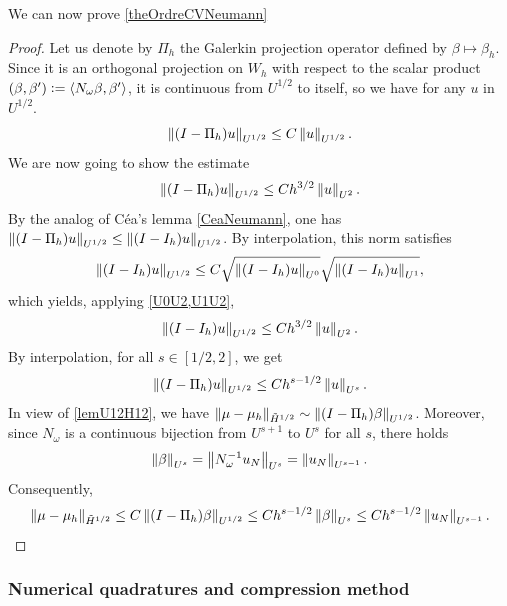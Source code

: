 \documentclass[a4paper]{article}
\begin{document}
\noindent We can now prove \autoref{theOrdreCVNeumann}
\begin{proof}
	Let us denote by $\Pi_h$ the Galerkin projection operator defined by $\beta \mapsto \beta_h$. Since it is an orthogonal projection on $W_h$ with respect to the scalar product $(\beta,\beta') \mathrel{\mathop:}= \left\langle N_\omega \beta,\beta'\right\rangle$, it is continuous from $U^{1/2}$ to itself, so we have for any $u$ in $U^{1/2}$. 
	\[\left\|(I - \Pi_h)u\right\|_{U^{1/2}} \leq C \left\|u\right\|_{U^{1/2}}.\]
	We are now going to show the estimate
	\[\left\|(I - \Pi_h)u\right\|_{U^{1/2}} \leq C h^{3/2} \left\|u\right\|_{U^{2}}.\]
	By the analog of Céa's lemma \autoref{CeaNeumann}, one has $\left\|(I-\Pi_h)u\right\|_{U^{1/2}} \leq \left\|(I - I_h) u\right\|_{U^{1/2}}$. By interpolation, this norm satisfies
	\[\left\|(I - I_h)u\right\|_{U^{1/2}} \leq C \sqrt{\left\|(I - I_h)u\right\|_{U^{0}}}\sqrt{\left\|(I - I_h)u\right\|_{U^{1}}},\]
	which yields, applying \autoref{U0U2,U1U2},
	\[\left\|(I - I_h)u\right\|_{U^{1/2}} \leq C h^{3/2} \left\|u\right\|_{U^2}.\]
	By interpolation, for all $s \in [1/2,2]$, we get
	\[\left\|(I - \Pi_h)u\right\|_{U^{1/2}} \leq C h^{s - 1/2} \left\|u\right\|_{U^s}.\]
	In view of \autoref{lemU12H12}, we have $\left\|\mu - \mu_h\right\|_{\tilde{H}^{1/2}} \sim \left\|(I - \Pi_h)\beta\right\|_{U^{1/2}}$. Moreover, since $N_\omega$ is a continuous bijection from $U^{s+1}$ to $U^s$ for all $s$, there holds
	\[\left\|\beta\right\|_{U^s} = \left\|N_\omega^{-1} u_N\right\|_{U^s} = \left\|u_N\right\|_{U^{s-1}}.\]
	Consequently, 
	\[\left\|\mu - \mu_h\right\|_{\tilde{H}^{1/2}} \leq  C\left\|(I - \Pi_h)\beta\right\|_{U^{1/2}} \leq C h^{s - 1/2} \left\|\beta\right\|_{U^s} \leq C h^{s - 1/2} \left\|u_N\right\|_{U^{s-1}}.\]
\end{proof}

\subsubsection{Numerical quadratures and compression method}
\end{document}
